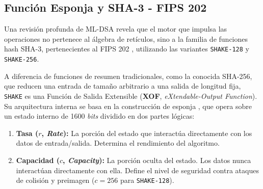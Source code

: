 \documentclass[11pt, a4paper]{report}
\theoremstyle{definition}
\begin{document}
\begin{table}[H]
    \centering
    \renewcommand{\arraystretch}{1.3}
    \caption{Requerimientos de almacenamiento y transmisión según FIPS 204.}
    \label{tab:tamanos_mldsa}
\end{table}

\subsection{Función Esponja y SHA-3 - FIPS 202}
\label{subsec:funcion_esponja}

Una revisión profunda de ML-DSA revela que el motor que impulsa las operaciones no pertenece al álgebra de retículos, sino a la familia de funciones hash SHA-3, pertenecientes al FIPS 202 \cite{nist_fips202}, utilizando las variantes \texttt{SHAKE-128} y \texttt{SHAKE-256}.

A diferencia de funciones de resumen tradicionales, como la conocida SHA-256, que reducen una entrada de tamaño arbitrario a una salida de longitud fija, \texttt{SHAKE} es una Función de Salida Extensible (\textbf{XOF}, \textit{eXtendable-Output Function}). Su arquitectura interna se basa en la construcción de esponja \cite{keccak_sponge}, que opera sobre un estado interno de 1600 \textit{bits} dividido en dos partes lógicas:
\begin{enumerate}
    \item \textbf{Tasa ($r$, \textit{Rate}):} La porción del estado que interactúa directamente con los datos de entrada/salida. Determina el rendimiento del algoritmo.
    \item \textbf{Capacidad ($c$, \textit{Capacity}):} La porción oculta del estado. Los datos nunca interactúan directamente con ella. Define el nivel de seguridad contra ataques de colisión y preimagen ($c = 256$ para \texttt{SHAKE-128}).
\end{enumerate}
\end{document}
